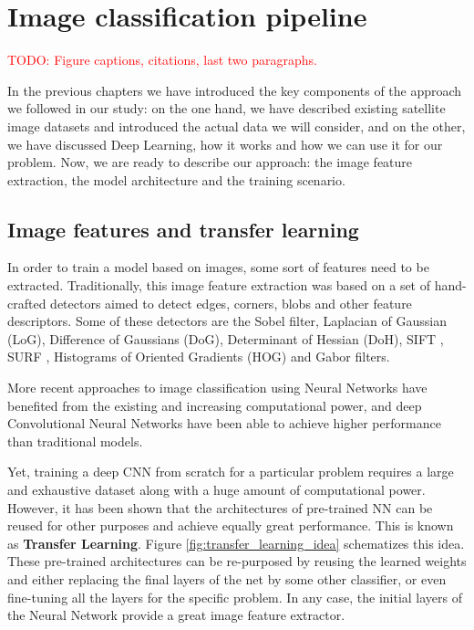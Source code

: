 
\chapter{Image classification pipeline}

\label{Chapter4}


\textcolor{red}{TODO: Figure captions, citations, last two paragraphs.}

In the previous chapters we have introduced the key components of the approach we followed in our study: on the one hand, we have described existing satellite image datasets and introduced the actual data we will consider, and on the other, we have discussed Deep Learning, how it works and how we can use it for our problem. Now, we are ready to describe our approach: the image feature extraction, the model architecture and the training scenario.

\section{Image features and transfer learning}\label{sec:transferLearning}

In order to train a model based on images, some sort of features need to be extracted. Traditionally, this image feature extraction was based on a set of hand-crafted detectors aimed to detect edges, corners, blobs and other feature descriptors. Some of these detectors are the Sobel filter, Laplacian of Gaussian (LoG), Difference of Gaussians (DoG), Determinant of Hessian (DoH), SIFT \parencite{Lowe1999,Lowe2004}, SURF \parencite{Bay2006}, Histograms of Oriented Gradients (HOG) \parencite{Dalal2005} and Gabor filters.

More recent approaches to image classification using Neural Networks have benefited from the existing and increasing computational power, and deep Convolutional Neural Networks have been able to achieve higher performance than traditional models. 

Yet, training a deep CNN from scratch for a particular problem requires a large and exhaustive dataset along with a huge amount of computational power. However, it has been shown that the architectures of pre-trained NN can be reused for other purposes and achieve equally great performance. This is known as \textbf{Transfer Learning}. Figure \ref{fig:transfer_learning_idea} schematizes this idea. These pre-trained architectures can be re-purposed by reusing the learned weights and either replacing the final layers of the net by some other classifier, or even fine-tuning all the layers for the specific problem. In any case, the initial layers of the Neural Network provide a great image feature extractor.

